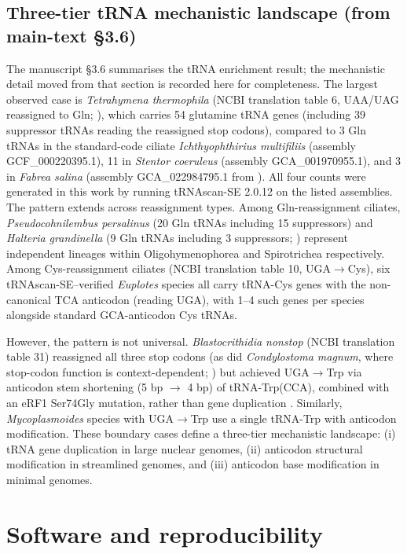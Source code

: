 \documentclass[preprint,11pt,authoryear,a4paper]{elsarticle}
\begin{document}
\subsection{Three-tier tRNA mechanistic landscape (from main-text §3.6)}

The manuscript §3.6 summarises the tRNA enrichment result; the
mechanistic detail moved from that section is recorded here for
completeness. The largest observed case is \emph{Tetrahymena
thermophila} (NCBI translation table 6, UAA/UAG reassigned to Gln;
\citep{hanyu1986}), which carries 54 glutamine tRNA genes (including 39
suppressor tRNAs reading the reassigned stop codons), compared to 3 Gln
tRNAs in the standard-code ciliate \emph{Ichthyophthirius multifiliis}
(assembly GCF\_000220395.1), 11 in \emph{Stentor coeruleus} (assembly
GCA\_001970955.1), and 3 in \emph{Fabrea salina} (assembly
GCA\_022984795.1 from \citep{zhang2022}). All four counts were generated
in this work by running tRNAscan-SE 2.0.12 on the listed assemblies. The
pattern extends across reassignment types. Among Gln-reassignment
ciliates, \emph{Pseudocohnilembus persalinus} (20 Gln tRNAs including 15
suppressors) and \emph{Halteria grandinella} (9 Gln tRNAs including 3
suppressors; \citep{zheng2021}) represent independent lineages within
Oligohymenophorea and Spirotrichea respectively. Among Cys-reassignment
ciliates (NCBI translation table 10, UGA\(\rightarrow\)Cys), six
tRNAscan-SE--verified \emph{Euplotes} species all carry tRNA-Cys genes
with the non-canonical TCA anticodon (reading UGA), with 1--4 such genes
per species alongside standard GCA-anticodon Cys tRNAs.

However, the pattern is not universal. \emph{Blastocrithidia nonstop}
(NCBI translation table 31) reassigned all three stop codons (as did
\emph{Condylostoma magnum}, where stop-codon function is
context-dependent; \citep{heaphy2016}) but achieved
UGA\(\rightarrow\)Trp via anticodon stem shortening (5 bp
\(\rightarrow\) 4 bp) of tRNA-Trp(CCA), combined with an eRF1 Ser74Gly
mutation, rather than gene duplication \citep{kachale2023}. Similarly,
\emph{Mycoplasmoides} species with UGA\(\rightarrow\)Trp use a single
tRNA-Trp with anticodon modification. These boundary cases define a
three-tier mechanistic landscape: (i) tRNA gene duplication in large
nuclear genomes, (ii) anticodon structural modification in streamlined
genomes, and (iii) anticodon base modification in minimal genomes.

\section{Software and reproducibility}\label{sec:s-software}
\end{document}
